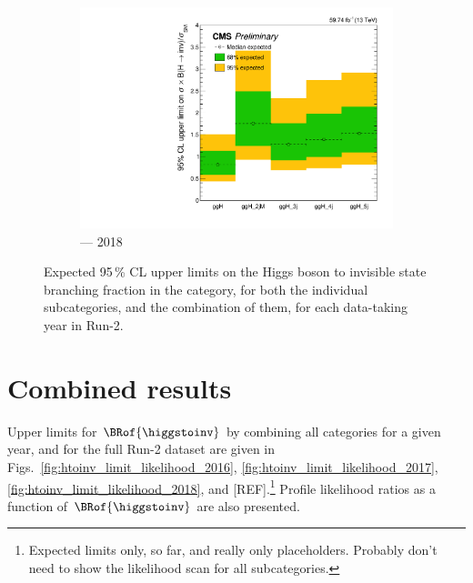 \begin{figure}[htbp]
    \begin{subfigure}[b]{0.45\textwidth}
        \includegraphics[width=\textwidth]{figures/limits/ggF/limit_2018_ggF_Scenario5.pdf}
        \caption{\ggH --- 2018}
    \end{subfigure}
    \caption[Expected 95\,\% CL upper limits on the Higgs boson to invisible state branching fraction in the \ggH category, for both the individual subcategories, and the combination of them, for each data-taking year in Run-2]{Expected 95\,\% CL upper limits on the Higgs boson to invisible state branching fraction in the \ggH category, for both the individual subcategories, and the combination of them, for each data-taking year in Run-2.}
    \label{fig:htoinv_limit_ggF}
\end{figure}




\section{Combined results}
\label{sec:htoinv_combined_results}


Upper limits for $\BRof{\higgstoinv}$ by combining all categories for a given year, and for the full Run-2 dataset are given in Figs.~\ref{fig:htoinv_limit_likelihood_2016}, \ref{fig:htoinv_limit_likelihood_2017}, \ref{fig:htoinv_limit_likelihood_2018}, and [REF].\footnote{Expected limits only, so far, and really only placeholders. Probably don't need to show the likelihood scan for all subcategories.} Profile likelihood ratios as a function of $\BRof{\higgstoinv}$ are also presented. %

